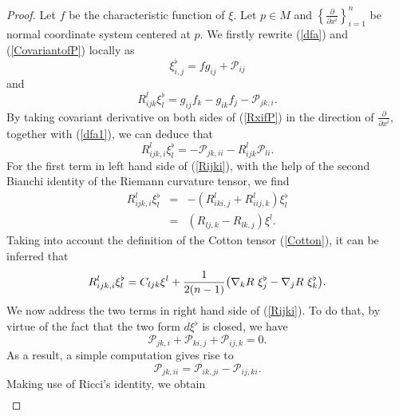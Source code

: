 \documentclass[10pt,a4paper]{amsart}
\begin{document}
    \begin{proof}
          Let $f$ be the characteristic function of $\xi.$ Let $p\in M$ and $\left\{\frac{\partial}{\partial x^i}\right\}_{i=1}^n$ be normal coordinate system centered at $p.$ We firstly rewrite (\ref{dfa}) and (\ref{CovariantofP}) locally as
          \begin{equation}\label{dfa1}
            \xi^{\flat}_{i,j}=fg_{ij}+\mathcal{P}_{ij}
          \end{equation}
          and
          \begin{equation}\label{RxifP}
             R_{ijk}^l\xi_l^{\flat}=g_{ij}f_k-g_{ik}f_j-\mathcal{P}_{jk,i}.
          \end{equation}
          By taking covariant derivative on both sides of (\ref{RxifP}) in the direction of $\frac{\partial}{\partial x^i},$ together with (\ref{dfa1}), we can deduce that
           \begin{equation}\label{Rijki}
             R_{ijk,i}^l\xi_l^{\flat}=-\mathcal{P}_{jk,ii}-R_{ijk}^l\mathcal{P}_{li}.
           \end{equation}
           For the first term in left hand side of (\ref{Rijki}), with the help of the second Bianchi identity of the Riemann curvature tensor, we find
           \begin{eqnarray*}
            R_{ijk,i}^l\xi_l^{\flat} &=&-(R_{iki,j}^l+R_{iij,k}^l)\xi_l^{\flat} \\
              &=&(R_{lj,k}-R_{lk,j})\xi^l.
           \end{eqnarray*}
           Taking into account the definition of the Cotton tensor (\ref{Cotton}), it can be inferred that
           \begin{eqnarray}\label{2}
            R_{ijk,i}^l\xi_l^{\flat} =C_{ljk}\xi^l+\frac{1}{2(n-1)}\big(\nabla_k{\rm{R}} ~\xi_j^{\flat}-\nabla_j{\rm{R}} ~\xi_k^{\flat}\big).
           \end{eqnarray}
           We now address the two terms in right hand side of (\ref{Rijki}). To do that, by virtue of the fact that the two form $d\xi^\flat$ is closed, we have
           \begin{equation*}
             \mathcal P_{jk,i}+\mathcal P_{ki,j}+\mathcal P_{ij,k}=0.
           \end{equation*}
           As a result, a simple computation gives rise to
           \[\mathcal P_{jk,ii}=\mathcal P_{ik,ji}-\mathcal P_{ij,ki}.\]
           Making use of Ricci's identity, we obtain
           \begin{eqnarray*}

\end{eqnarray*}
\end{proof}
\end{document}
